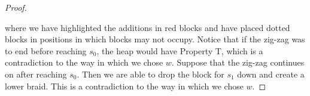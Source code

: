 \begin{theorem}
\begin{proof}
\begin{center}
	\end{center}
	where we have highlighted the additions in \textcolor{rred}{red} blocks and have placed dotted blocks in positions in which blocks may not occupy. Notice that if the zig-zag was to end before reaching $s_0$, the heap would have Property T, which is a contradiction to the way in which we chose $w$. Suppose that the zig-zag continues on after reaching $s_0$. Then we are able to drop the block for $s_1$ down and create a lower braid. This is a contradiction to the way in which we chose $w$.
	

\end{proof}
\end{theorem}
